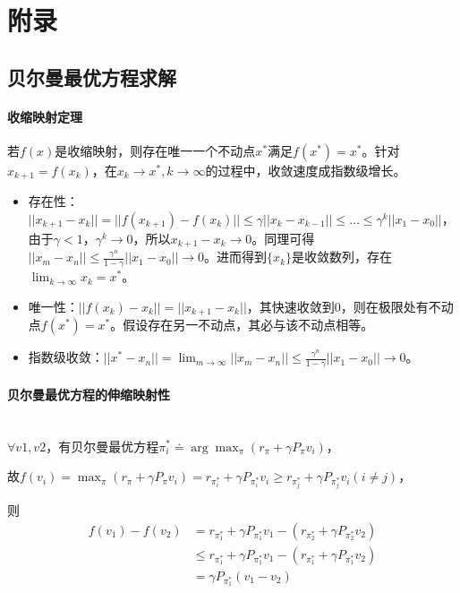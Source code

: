 \documentclass[
12pt, %
a4paper, 
oneside, %
headinclude,footinclude, %
]{scrartcl}
\begin{document}
\section{附录}
\subsection{贝尔曼最优方程求解}\label{sec:Scalability Mapping}
\paragraph{收缩映射定理}
若$ f(x) $是收缩映射，则存在唯一一个不动点$ x^* $满足$ f(x^*) = x^* $。针对$ x_{k + 1} = f(x_k) $，在$ x_k \to x^*, k \to \infty $的过程中，收敛速度成指数级增长。
\begin{itemize}
\item 存在性：$ ||x_{k + 1} - x_k|| = ||f(x_{k + 1}) - f(x_k)|| \leq \gamma||x_k - x_{k - 1}|| \leq \dots \leq \gamma^k||x_1 - x_0|| $，由于$ \gamma < 1 $，$ \gamma^k \to 0 $，所以$ x_{k + 1} - x_k \to 0 $。同理可得$ ||x_m - x_n|| \leq \frac{\gamma^n}{1 - \gamma}||x_1 - x_0|| \to 0 $。进而得到$ \{x_k\} $是收敛数列，存在$ \lim_{k \to \infty} x_k = x^* $。
\item 唯一性：$ ||f(x_k) - x_k|| = ||x_{k + 1} - x_k||$，其快速收敛到$ 0 $，则在极限处有不动点$ f(x^*) = x^* $。假设存在另一不动点，其必与该不动点相等。
\item 指数级收敛：$ ||x^* - x_n|| = \lim_{m \to \infty}||x_m - x_n|| \leq \frac{\gamma^n}{1 - \gamma}||x_1 - x_0|| \to 0 $。
\end{itemize}
\paragraph{贝尔曼最优方程的伸缩映射性}~\\

$ \forall v1,v2 $，有贝尔曼最优方程$ \pi_i^* \doteq \arg \max_{\pi} (r_\pi + \gamma P_\pi v_i) $，

故$ f(v_i) = \max_{\pi} (r_\pi + \gamma P_\pi v_i) = r_{\pi_i^*} + \gamma P_{\pi_i^*} v_i \geq r_{\pi_j^*} + \gamma P_{\pi_j^*} v_i (i \neq j) $，

则
\begin{align*}
f(v_1) - f(v_2) 
&= r_{\pi_1^*} + \gamma P_{\pi_1^*} v_1 - (r_{\pi_2^*} + \gamma P_{\pi_2^*} v_2) \\
&\leq r_{\pi_1^*} + \gamma P_{\pi_1^*} v_1 - (r_{\pi_1^*} + \gamma P_{\pi_1^*} v_2) \\
&= \gamma P_{\pi_1^*} (v_1 - v_2)
\end{align*}
\end{document}
